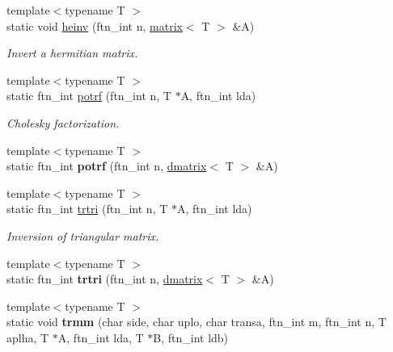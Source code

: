\begin{DoxyCompactItemize}
\item 
{\footnotesize template$<$typename T $>$ }\\static void \hyperlink{classsddk_1_1linalg_3_01_c_p_u_01_4_a6cc60760ccf4fd0dcc5acb9612a22644}{heinv} (ftn\+\_\+int n, \hyperlink{classsddk_1_1mdarray}{matrix}$<$ T $>$ \&A)
\begin{DoxyCompactList}\small\item\em Invert a hermitian matrix. \end{DoxyCompactList}\item 
{\footnotesize template$<$typename T $>$ }\\static ftn\+\_\+int \hyperlink{classsddk_1_1linalg_3_01_c_p_u_01_4_a3580a2d3ddc3d7e59eef83f653fbc7a1}{potrf} (ftn\+\_\+int n, T $\ast$A, ftn\+\_\+int lda)
\begin{DoxyCompactList}\small\item\em Cholesky factorization. \end{DoxyCompactList}\item 
\hypertarget{classsddk_1_1linalg_3_01_c_p_u_01_4_aeab2121f587c9c92413ec587c935acb5}{}{\footnotesize template$<$typename T $>$ }\\static ftn\+\_\+int {\bfseries potrf} (ftn\+\_\+int n, \hyperlink{classsddk_1_1dmatrix}{dmatrix}$<$ T $>$ \&A)\label{classsddk_1_1linalg_3_01_c_p_u_01_4_aeab2121f587c9c92413ec587c935acb5}

\item 
{\footnotesize template$<$typename T $>$ }\\static ftn\+\_\+int \hyperlink{classsddk_1_1linalg_3_01_c_p_u_01_4_a5e5dee97a80a8cca9a47c756a3ff2c4f}{trtri} (ftn\+\_\+int n, T $\ast$A, ftn\+\_\+int lda)
\begin{DoxyCompactList}\small\item\em Inversion of triangular matrix. \end{DoxyCompactList}\item 
\hypertarget{classsddk_1_1linalg_3_01_c_p_u_01_4_aaa1eb8159ee112b5acf8f168705ef00a}{}{\footnotesize template$<$typename T $>$ }\\static ftn\+\_\+int {\bfseries trtri} (ftn\+\_\+int n, \hyperlink{classsddk_1_1dmatrix}{dmatrix}$<$ T $>$ \&A)\label{classsddk_1_1linalg_3_01_c_p_u_01_4_aaa1eb8159ee112b5acf8f168705ef00a}

\item 
\hypertarget{classsddk_1_1linalg_3_01_c_p_u_01_4_a3db534148a6eb8ce4f94ff7784635998}{}{\footnotesize template$<$typename T $>$ }\\static void {\bfseries trmm} (char side, char uplo, char transa, ftn\+\_\+int m, ftn\+\_\+int n, T aplha, T $\ast$A, ftn\+\_\+int lda, T $\ast$B, ftn\+\_\+int ldb)\label{classsddk_1_1linalg_3_01_c_p_u_01_4_a3db534148a6eb8ce4f94ff7784635998}


\end{DoxyCompactItemize}
